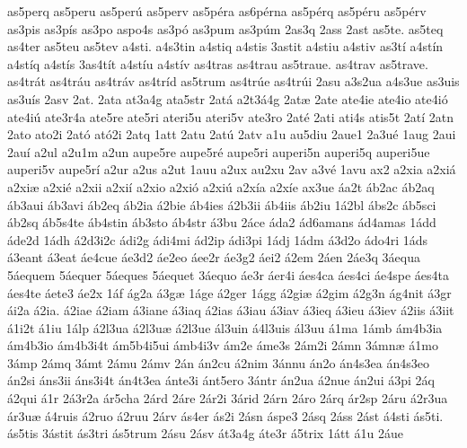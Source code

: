 {as5perq
as5peru
as5per^^fa
as5perv
as5p^^e9ra
as6p^^e9rna
as5p^^e9rq
as5p^^e9ru
as5p^^e9rv
as3pis
as3p^^eds
as3po
aspo4s
as3p^^f3
as3pum
as3p^^fam
2as3q
2ass
2ast
as5te.
as5teq
as4ter
as5teu
as5tev
a4sti.
a4s3tin
a4stiq
a4stis
3astit
a4stiu
a4stiv
as3t^^ed
a4st^^edn
a4st^^edq
a4st^^eds
3as4t^^edt
a4st^^edu
a4st^^edv
as4tras
as4trau
as5traue.
as4trav
as5trave.
as4tr^^e1t
as4tr^^e1u
as4tr^^e1v
as4tr^^edd
as5trum
as4tr^^fae
as4tr^^fai
2asu
a3s2ua
a4s3ue
as3uis
as3u^^eds
2asv
2at.
2ata
at3a4g
ata5str
2at^^e1
a2t3^^e14g
2at^^e6
2ate
ate4ie
ate4io
ate4i^^f3
ate4i^^fa
ate3r4a
ate5re
ate5ri
ateri5u
ateri5v
ate3ro
2at^^e9
2ati
ati4s
atis5t
2at^^ed
2atn
2ato
ato2i
2at^^f3
at^^f32i
2atq
1att
2atu
2at^^fa
2atv
a1u
au5diu
2aue1
2a3u^^e9
1aug
2aui
2au^^ed
a2ul
a2u1m
a2un
aupe5re
aupe5r^^e9
aupe5ri
auperi5n
auperi5q
auperi5ue
auperi5v
aupe5r^^ed
a2ur
a2us
a2ut
1auu
a2ux
au2xu
2av
a3v^^e9
1avu
ax2
a2xia
a2xi^^e1
a2xi^^e6
a2xi^^e9
a2xii
a2xi^^ed
a2xio
a2xi^^f3
a2xi^^fa
a2x^^eda
a2x^^ede
ax3ue
^^e1a2t
^^e1b2ac
^^e1b2aq
^^e1b3aui
^^e1b3avi
^^e1b2eq
^^e1b2ia
^^e12bie
^^e1b4ies
^^e12b3ii
^^e1b4iis
^^e1b2iu
1^^e12bl
^^e1bs2c
^^e1b5sci
^^e1b2sq
^^e1b5s4te
^^e1b4stin
^^e1b3sto
^^e1b4str
^^e13bu
2^^e1ce
^^e1da2
^^e1d6amans
^^e1d4amas
1^^e1dd
^^e1de2d
1^^e1dh
^^e12d3i2c
^^e1di2g
^^e1di4mi
^^e1d2ip
^^e1di3pi
1^^e1dj
1^^e1dm
^^e13d2o
^^e1do4ri
1^^e1ds
^^e13eant
^^e13eat
^^e1e4cue
^^e1e3d2
^^e1e2eo
^^e1ee2r
^^e1e3g2
^^e1ei2
^^e12em
2^^e1en
2^^e1e3q
3^^e1equa
5^^e1equem
5^^e1equer
5^^e1eques
5^^e1equet
3^^e1equo
^^e1e3r
^^e1er4i
^^e1es4ca
^^e1es4ci
^^e1e4spe
^^e1es4ta
^^e1es4te
^^e1ete3
^^e1e2x
1^^e1f
^^e1g2a
^^e13g^^e6
1^^e1ge
^^e12ger
1^^e1gg
^^e12gi^^e6
^^e12gim
^^e12g3n
^^e1g4nit
^^e13gr
^^e1i2a
^^e12ia.
^^e12iae
^^e12iam
^^e13iane
^^e13iaq
^^e12ias
^^e13iau
^^e13iav
^^e13ieq
^^e13ieu
^^e13iev
^^e12iis
^^e13iit
^^e11i2t
^^e11iu
1^^e1lp
^^e12l3ua
^^e12l3u^^e6
^^e12l3ue
^^e1l3uin
^^e14l3uis
^^e1l3uu
^^e11ma
1^^e1mb
^^e1m4b3ia
^^e1m4b3io
^^e1m4b3i4t
^^e1m5b4i5ui
^^e1mb4i3v
^^e1m2e
^^e1me3s
2^^e1m2i
2^^e1mn
3^^e1mn^^e6
^^e11mo
3^^e1mp
2^^e1mq
3^^e1mt
2^^e1mu
2^^e1mv
2^^e1n
^^e1n2cu
^^e12nim
3^^e1nnu
^^e1n2o
^^e1n4s3ea
^^e1n4s3eo
^^e1n2si
^^e1ns3ii
^^e1ns3i4t
^^e1n4t3ea
^^e1nte3i
^^e1nt5ero
3^^e1ntr
^^e1n2ua
^^e12nue
^^e1n2ui
^^e13pi
2^^e1q
^^e12qui
^^e11r
2^^e13r2a
^^e1r5cha
2^^e1rd
2^^e1re
2^^e1r2i
3^^e1rid
2^^e1rn
2^^e1ro
2^^e1rq
^^e1r2sp
2^^e1ru
^^e12r3ua
^^e1r3u^^e6
^^e14ruis
^^e12ruo
^^e12ruu
2^^e1rv
^^e1s4er
^^e1s2i
2^^e1sn
^^e1spe3
2^^e1sq
2^^e1ss
2^^e1st
^^e14sti
^^e1s5ti.
^^e1s5tis
3^^e1stit
^^e1s3tri
^^e1s5trum
2^^e1su
2^^e1sv
^^e1t3a4g
^^e1te3r
^^e15trix
1^^e1tt
^^e11u
2^^e1ue
}
